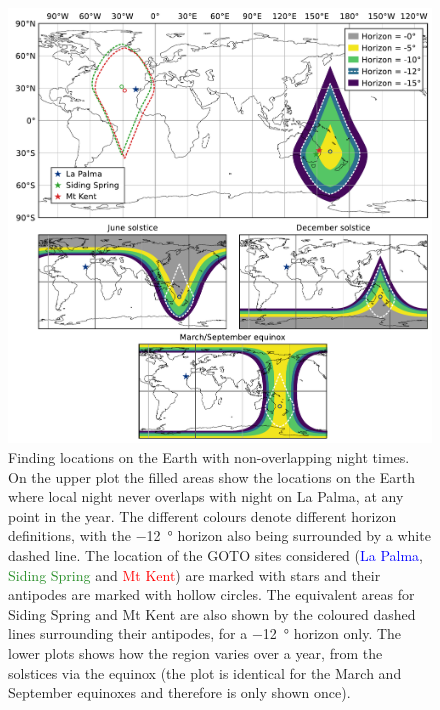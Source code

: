 \begin{colsection}
\begin{colsection}
\begin{figure}[p]
\begin{center}
\includegraphics[width=\linewidth]{images/sites.pdf}
\end{center}

\caption[Locations on the Earth with non-overlapping night times]{Finding locations on the Earth with non-overlapping night times. On the upper plot the filled areas show the locations on the Earth where local night never overlaps with night on La Palma, at any point in the year. The different colours denote different horizon definitions, with the \SI{-12}{\degree} horizon also being surrounded by a white dashed line. The location of the GOTO sites considered (\textcolor{blue}{La Palma}, \textcolor{ForestGreen}{Siding Spring} and \textcolor{red}{Mt Kent}) are marked with stars and their antipodes are marked with hollow circles. The equivalent areas for Siding Spring and Mt Kent are also shown by the coloured dashed lines surrounding their antipodes, for a \SI{-12}{\degree} horizon only. The lower plots shows how the region varies over a year, from the solstices via the equinox (the plot is identical for the March and September equinoxes and therefore is only shown once).
}
\label{fig:site_nights}
\end{figure}


\end{colsection}
\end{colsection}
